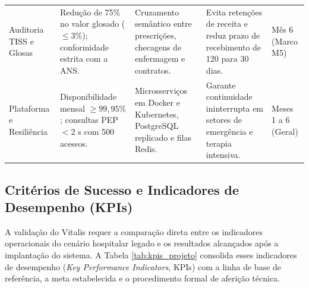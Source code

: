 \begin{table}[!htbp]
\begin{tabularx}{\textwidth}{>{\raggedright\arraybackslash}p{2.3cm} >{\raggedright\arraybackslash}p{2.9cm} >{\raggedright\arraybackslash}p{2.9cm} >{\raggedright\arraybackslash}X >{\raggedright\arraybackslash}p{1.8cm}}
\addlinespace
Auditoria TISS e Glosas &
Redução de 75\% no valor glosado ($\le 3\%$); conformidade estrita com a ANS. &
Cruzamento semântico entre prescrições, checagens de enfermagem e contratos. &
Evita retenções de receita e reduz prazo de recebimento de 120 para 30 dias. &
Mês 6 \newline (Marco M5) \\
\addlinespace
Plataforma e Resiliência &
Disponibilidade mensal $\ge 99{,}95\%$; consultas PEP $< 2$ s com 500 acessos. &
Microsserviços em Docker e Kubernetes, PostgreSQL replicado e filas Redis. &
Garante continuidade ininterrupta em setores de emergência e terapia intensiva. &
Meses 1 a 6 \newline (Geral) \\
\bottomrule
\end{tabularx}
\end{table}

\subsection{Critérios de Sucesso e Indicadores de Desempenho (KPIs)}
\label{subsec:criterios_sucesso}

A validação do Vitalis requer a comparação direta entre os indicadores operacionais do cenário hospitalar legado e os resultados alcançados após a implantação do sistema. A Tabela \ref{tab:kpis_projeto} consolida esses indicadores de desempenho (\textit{Key Performance Indicators}, KPIs) com a linha de base de referência, a meta estabelecida e o procedimento formal de aferição técnica.

